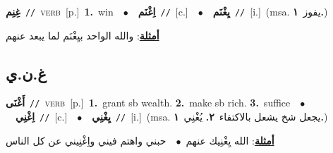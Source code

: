 \documentclass[10pt,a4paper,twoside]{article} %
\begin{document}
\begin{multicols}{2}
{\setlength\topsep{0pt}\textbf{\foreignlanguage{arabic}{غِنِم}}\ {\color{gray}\texttt{//}\color{black}}\ \textsc{verb}\ [p.]\ \textbf{1.}~win\ \ $\bullet$\ \ \setlength\topsep{0pt}\textbf{\foreignlanguage{arabic}{اِغْنَم}}\ {\color{gray}\texttt{//}\color{black}}\ [c.]\ \ $\bullet$\ \ \setlength\topsep{0pt}\textbf{\foreignlanguage{arabic}{يِغْنَم}}\ {\color{gray}\texttt{//}\color{black}}\ [i.]\ \color{gray}(msa. \foreignlanguage{arabic}{يفوز}~\foreignlanguage{arabic}{\textbf{١.}})\color{black}\  \begin{flushright}\color{gray}\foreignlanguage{arabic}{\textbf{\underline{\foreignlanguage{arabic}{أمثلة}}}: والله الواحد بيِغْنَم لما يبعد عنهم}\end{flushright}\color{black}} \vspace{2mm}

\vspace{-3mm}
\subsection*{\color{blue}\foreignlanguage{arabic}{غ.ن.ي}\color{blue}{}} 

{\setlength\topsep{0pt}\textbf{\foreignlanguage{arabic}{أَغْنَى}}\ {\color{gray}\texttt{//}\color{black}}\ \textsc{verb}\ [p.]\ \textbf{1.}~grant sb wealth.  \textbf{2.}~make sb rich.  \textbf{3.}~suffice\ \ $\bullet$\ \ \setlength\topsep{0pt}\textbf{\foreignlanguage{arabic}{اِغْنِي}}\ {\color{gray}\texttt{//}\color{black}}\ [c.]\ \ $\bullet$\ \ \setlength\topsep{0pt}\textbf{\foreignlanguage{arabic}{يِغْنِي}}\ {\color{gray}\texttt{//}\color{black}}\ [i.]\ \color{gray}(msa. \foreignlanguage{arabic}{يجعل شخ يشعل بالاكتفاء}~\foreignlanguage{arabic}{\textbf{٢.}}  \foreignlanguage{arabic}{يُغْنِي}~\foreignlanguage{arabic}{\textbf{١.}})\color{black}\  \begin{flushright}\color{gray}\foreignlanguage{arabic}{\textbf{\underline{\foreignlanguage{arabic}{أمثلة}}}: الله يِغْنِيك عنهم\ $\bullet$\ \  حبني واهتم فيني واِغْنِيني عن كل الناس}\end{flushright}\color{black}} \vspace{2mm}


\end{multicols}
\end{document}
